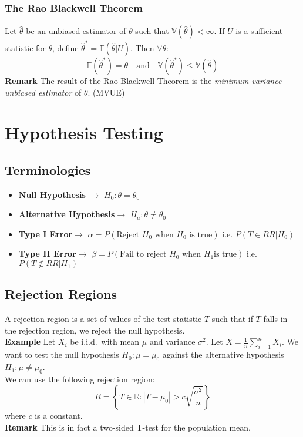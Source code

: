 \documentclass[sn-mathphys,Numbered]{sn-jnl}%
\newcommand{\Var}{\mathbb{V}}
\newcommand{\E}{\mathbb{E}}
\newcommand{\Remark}{\textbf{Remark }}
\newcommand{\Example}{\textbf{Example }}
\begin{document}
\subsubsection{The Rao Blackwell Theorem}\label{rao-blackwell}
Let $\hat{\theta}$ be an unbiased estimator of $\theta$ such that
$\Var(\hat{\theta}) < \infty$. If $U$ is a sufficient statistic for $\theta$,
define $\hat \theta ^ * = \E (\hat \theta | U)$. Then $\forall \theta$:
\begin{equation}
    \E(\hat \theta ^ *) = \theta \quad \text{and} \quad \Var(\hat \theta ^ *) \leq
    \Var(\hat \theta)\nonumber
\end{equation}
\Remark{The result of the Rao Blackwell Theorem is the
    \textit{minimum-variance unbiased estimator} of $\theta$. (MVUE)}

\section{Hypothesis Testing}\label{hypothesis-testing}
\subsection{Terminologies}\label{testing-terminologies}
\begin{itemize}
    \item \textbf{Null Hypothesis} $\to$ $H_0: \theta = \theta_0$
    \item \textbf{Alternative Hypothesis}$\to$ $H_a: \theta \neq \theta_0$
    \item \textbf{Type I Error}$\to$ $\alpha = P(\text{Reject } H_0 \text{ when } H_0 \text{ is
                  true})$ i.e. $P(T \in RR | H_0)$
    \item \textbf{Type II Error}$\to$ $\beta = P(\text{Fail to reject } H_0 \text{ when } H_1 \text{
                  is true})$ i.e. $P(T \not \in RR | H_1)$
\end{itemize}
\subsection{Rejection Regions}\label{rejection-regions}
A rejection region is a set of values of the test statistic $T$ such that if
$T$ falls in the rejection region, we reject the null hypothesis.\\ \Example
Let $X_i$ be i.i.d.\ with mean $\mu$ and variance $\sigma^2$. Let $\bar X =
    \frac{1}{n} \sum_{i=1}^n X_i$. We want to test the null hypothesis $H_0: \mu =
    \mu_0$ against the alternative hypothesis $H_1: \mu \neq \mu_0$.\\ We can use
the following rejection region:
\begin{equation}
    R = \left\{ T \in \mathbb{R} : |T - \mu_0| > c \sqrt{\frac{\sigma^2}{n}} \right\}
\end{equation}
where $c$ is a constant.\\
\Remark{This is in fact a two-sided T-test for the population mean.}
\end{document}
